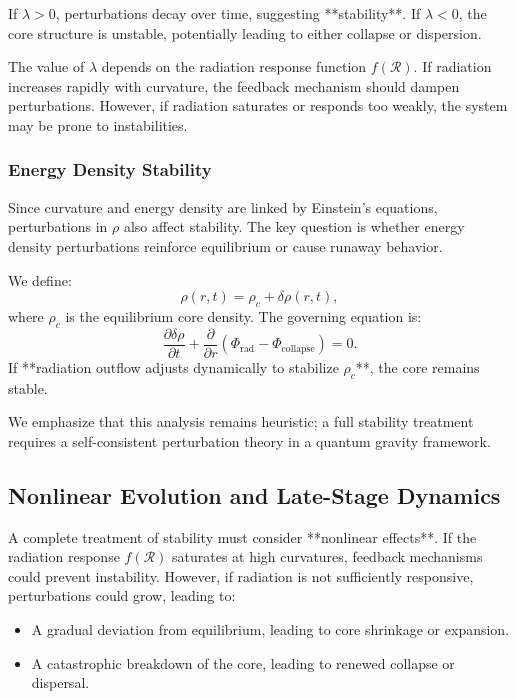 If \( \lambda > 0 \), perturbations decay over time, suggesting **stability**. If \( \lambda < 0 \), the core structure is unstable, potentially leading to either collapse or dispersion.

The value of \( \lambda \) depends on the radiation response function \( f(\mathcal{R}) \). If radiation increases rapidly with curvature, the feedback mechanism should dampen perturbations. However, if radiation saturates or responds too weakly, the system may be prone to instabilities.

\subsubsection{Energy Density Stability}
Since curvature and energy density are linked by Einstein’s equations, perturbations in \( \rho \) also affect stability. The key question is whether energy density perturbations reinforce equilibrium or cause runaway behavior.

We define:
\begin{equation}
    \rho(r,t) = \rho_c + \delta \rho(r,t),
\end{equation}
where \( \rho_c \) is the equilibrium core density. The governing equation is:
\begin{equation}
    \frac{\partial \delta \rho}{\partial t} + \frac{\partial}{\partial r} \left( \Phi_\text{rad} - \Phi_\text{collapse} \right) = 0.
\end{equation}
If **radiation outflow adjusts dynamically to stabilize \( \rho_c \)**, the core remains stable.

We emphasize that this analysis remains heuristic; a full stability treatment requires a self-consistent perturbation theory in a quantum gravity framework.

\subsection{Nonlinear Evolution and Late-Stage Dynamics}
A complete treatment of stability must consider **nonlinear effects**. If the radiation response \( f(\mathcal{R}) \) saturates at high curvatures, feedback mechanisms could prevent instability. However, if radiation is not sufficiently responsive, perturbations could grow, leading to:
\begin{itemize}
    \item A gradual deviation from equilibrium, leading to core shrinkage or expansion.
    \item A catastrophic breakdown of the core, leading to renewed collapse or dispersal.
\end{itemize}

